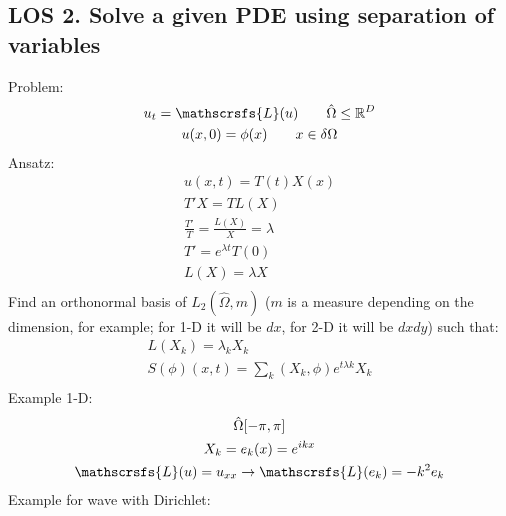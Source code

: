 \documentclass[12pt, a4paper]{article}
\begin{document}
\subsection*{LOS 2. Solve a given PDE using separation of variables}
Problem:
\begin{gather*}
    u_t = \mathscrsfs{L}(u) \qquad  \hat{\Omega} \leq \mathbb{R}^D\\
    u(x, 0) = \phi(x) \qquad x \in \delta\Omega\\
\end{gather*}
Ansatz:
\begin{gather*}
    u(x, t) = T(t)X(x)\\
    T'X = TL(X)\\
    \frac{T'}{T} = \frac{L(X)}{X} = \lambda\\
    T' = e^{\lambda t}T(0)\\
    L(X) = \lambda X\\
\end{gather*}
Find an orthonormal basis of $L_2(\hat{\Omega}, m)$ ($m$ is a measure depending on the dimension, for example; for 1-D it will be $dx$, for 2-D it will be $dxdy$) such that:
\begin{gather*}
    L(X_k) = \lambda_k X_k\\
    S(\phi)(x, t) = \sum_{k} (X_k, \phi)e^{t\lambda k}X_k\\
\end{gather*}
Example 1-D:
\begin{gather*}
    \hat{\Omega} [-\pi, \pi]\\
    X_k = e_k(x) = e^{ikx}\\
    \mathscrsfs{L}(u) = u_{xx} \rightarrow \mathscrsfs{L}(e_k) = -k^2e_k\\
\end{gather*}
Example for wave with Dirichlet:
\end{document}
